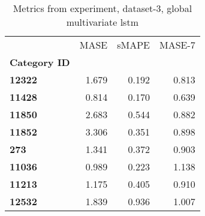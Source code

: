 \begin{table}[h]
\centering
\caption{Metrics from experiment, dataset-3, global multivariate lstm}
\label{table:global-multivariate-lstm-dataset-3}
\begin{tabular}{lrrr}
\toprule
{} &   MASE &  sMAPE &  MASE-7 \\
\textbf{Category ID} &        &        &         \\
\midrule
\textbf{12322      } &  1.679 &  0.192 &   0.813 \\
\textbf{11428      } &  0.814 &  0.170 &   0.639 \\
\textbf{11850      } &  2.683 &  0.544 &   0.882 \\
\textbf{11852      } &  3.306 &  0.351 &   0.898 \\
\textbf{273        } &  1.341 &  0.372 &   0.903 \\
\textbf{11036      } &  0.989 &  0.223 &   1.138 \\
\textbf{11213      } &  1.175 &  0.405 &   0.910 \\
\textbf{12532      } &  1.839 &  0.936 &   1.007 \\
\bottomrule
\end{tabular}
\end{table}
